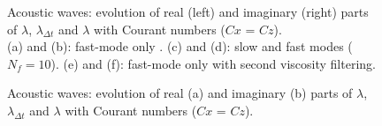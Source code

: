 \documentclass[a4paper,11pt]{article}
\begin{document}
\begin{figure}[!ht]
   \quad
   \caption{Acoustic waves: evolution of real (left) and imaginary (right) parts of $\lambda$, $\lambda_{\Delta t}$ and $\lambda$ with 
            Courant numbers ($Cx$ = $Cz$).\\
            (a) and (b): fast-mode only .
            (c) and (d): slow and fast modes ($N_f= 10$).
            (e) and (f): fast-mode only with second viscosity filtering.}
   \label{FigLambdaacous}
\end{figure}

\begin{figure}[!ht]
   \centering
   \quad
   \caption{Acoustic waves: evolution of real (a) and imaginary (b) parts of $\lambda$, $\lambda_{\Delta t}$ and $\lambda$ with 
            Courant numbers ($Cx$ = $Cz$).}
   \label{FigLambdaacous2}
\end{figure}
\end{document}
